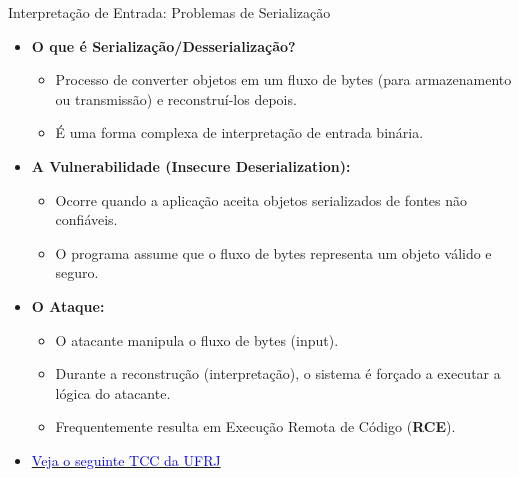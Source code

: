 \begin{frame}{Interpretação de Entrada: Problemas de Serialização}
    \begin{itemize}
        \item \textbf{O que é Serialização/Desserialização?}
              \begin{itemize}
                  \item Processo de converter objetos em um fluxo de bytes (para armazenamento ou transmissão) e reconstruí-los depois.
                  \item É uma forma complexa de interpretação de entrada binária.
              \end{itemize}

        \item \textbf{A Vulnerabilidade (Insecure Deserialization):}
              \begin{itemize}
                  \item Ocorre quando a aplicação aceita objetos serializados de fontes não confiáveis.
                  \item O programa assume que o fluxo de bytes representa um objeto válido e seguro.
              \end{itemize}

        \item \textbf{O Ataque:}
              \begin{itemize}
                  \item O atacante manipula o fluxo de bytes (input).
                  \item Durante a reconstrução (interpretação), o sistema é forçado a executar a lógica do atacante.
                  \item Frequentemente resulta em Execução Remota de Código (\textbf{RCE}).
              \end{itemize}
        \item \href{http://www.repositorio.poli.ufrj.br/monografias/projpoli10048122.pdf}{\textcolor{blue}{Veja o seguinte TCC da UFRJ}}
    \end{itemize}
\end{frame}

